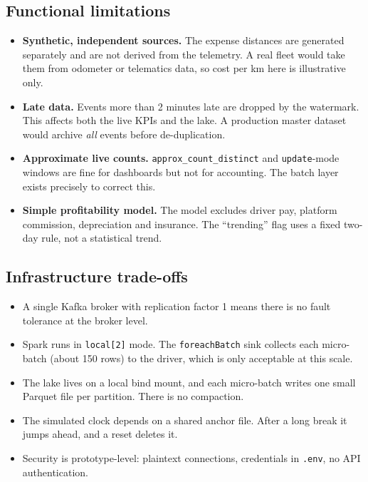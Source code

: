 \documentclass[11pt,a4paper]{article}
\newcommand{\code}[1]{\texttt{\small #1}}
\begin{document}
\subsection{Functional limitations}
\begin{itemize}
  \item \textbf{Synthetic, independent sources.} The expense distances are generated separately and
    are not derived from the telemetry. A real fleet would take them from odometer or telematics
    data, so cost per km here is illustrative only.
  \item \textbf{Late data.} Events more than 2 minutes late are dropped by the watermark. This
    affects both the live KPIs and the lake. A production master dataset would archive
    \emph{all} events before de-duplication.
  \item \textbf{Approximate live counts.} \code{approx\_count\_distinct} and \code{update}-mode
    windows are fine for dashboards but not for accounting. The batch layer exists precisely to
    correct this.
  \item \textbf{Simple profitability model.} The model excludes driver pay, platform commission,
    depreciation and insurance. The ``trending'' flag uses a fixed two-day rule, not a statistical
    trend.
\end{itemize}

\subsection{Infrastructure trade-offs}
\begin{itemize}
  \item A single Kafka broker with replication factor 1 means there is no fault tolerance at the
    broker level.
  \item Spark runs in \code{local[2]} mode. The \code{foreachBatch} sink collects each micro-batch
    (about 150 rows) to the driver, which is only acceptable at this scale.
  \item The lake lives on a local bind mount, and each micro-batch writes one small Parquet file
    per partition. There is no compaction.
  \item The simulated clock depends on a shared anchor file. After a long break it jumps ahead, and
    a reset deletes it.
  \item Security is prototype-level: plaintext connections, credentials in \code{.env}, no API
    authentication.
\end{itemize}
\end{document}
